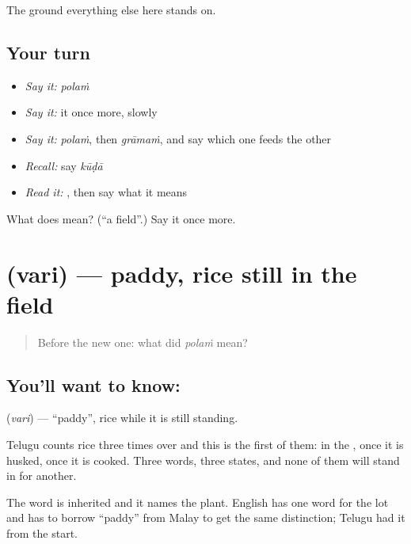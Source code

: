 \begin{grammarlens}[title={What you've built}]
The ground everything else here stands on.
\end{grammarlens}

\subsection*{Your turn}
\begin{itemize}
\raggedright
  \item \emph{Say it:} \emph{polaṁ}
  \item \emph{Say it:} it once more, slowly
  \item \emph{Say it:} \emph{polaṁ}, then \emph{grāmaṁ}, and say which one feeds the other
  \item \emph{Recall:} say \emph{kūḍā}
  \item \emph{Read it:} \textbf{}, then say what it means
\end{itemize}

\begin{tcolorbox}[breakable,colback=teal!4,colframe=teal!35!black,title={Before you move on}]
What does  mean? (\textquotedblleft{}a field\textquotedblright{}.) Say it once more.
\end{tcolorbox}
\section[\texorpdfstring{\te{వరి} (vari)}{వరి (vari)}]{ (vari) — paddy, rice still in the field}

\label{lesson:TE-C66-paddy}



\begin{quote}
Before the new one: what did \emph{polaṁ} mean?
\end{quote}

\subsection*{You'll want to know: }
\textbf{} (\emph{vari}) — \textquotedblleft{}paddy\textquotedblright{}, rice while it is still standing.

Telugu counts rice three times over and this is the first of them:  in the ,  once it is husked,  once it is cooked. Three words, three states, and none of them will stand in for another.

The word is inherited and it names the plant. English has one word for the lot and has to borrow \textquotedblleft{}paddy\textquotedblright{} from Malay to get the same distinction; Telugu had it from the start.

